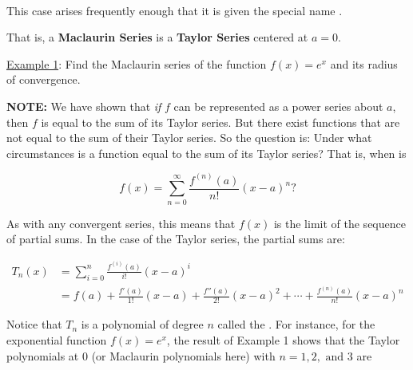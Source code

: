 \documentclass[paper=a4, fontsize=11pt]{scrartcl} %
\numberwithin{equation}{section} %
\numberwithin{figure}{section} %
\numberwithin{table}{section} %
\newcommand{\ds}{\displaystyle}
\begin{document}
\fbox{
  \parbox{\textwidth}{
  \vspace{5pt}
  
  \[f(x) = \ds\sum_{n=0}^\infty \ds\frac{f^{(n)}(0)}{n!}x^{n} = f(0) + \ds\frac{f'(0)}{1!} + \ds\frac{f''(0)}{2!}x^2 + \cdots\]
  }}
  \indent\\
  \indent
  
  This case arises frequently enough that it is given the special name \underline{\hspace{1in}} \underline{\hspace{1in}}. \\
  \indent
  
  That is, a \textbf{Maclaurin Series} is a \textbf{Taylor Series} centered at $a=0$.\\
  \indent
  
  \newpage
  
  \underline{Example 1}: Find the Maclaurin series of the function $f(x)=e^x$ and its radius of convergence.\\
  \indent
  
  \vspace{4in}
  
  \newpage
  
  \textbf{NOTE:} We have shown that \textit{if} $f$ can be represented as a power series about $a$, then $f$ is equal to the sum of its Taylor series. But there exist functions that are not equal to the sum of their Taylor series. So the question is: Under what circumstances is a function equal to the sum of its Taylor series? That is, when is
  
  \[f(x) = \ds\sum_{n=0}^\infty \ds\frac{f^{(n)}(a)}{n!}(x-a)^n ?\]
  
  As with any convergent series, this means that $f(x)$ is the limit of the sequence of partial sums. In the case of the Taylor series, the partial sums are:
  
  \begin{align*}
  T_n(x) &= \ds\sum_{i=0}^n \ds\frac{f^{(i)}(a)}{i!}(x-a)^i\\
  &= f(a) + \ds\frac{f'(a)}{1!}(x-a) + \ds\frac{f''(a)}{2!}(x-a)^2 + \cdots + \ds\frac{f^{(n)}(a)}{n!}(x-a)^n
  \end{align*}
  \indent
  
  Notice that $T_n$ is a polynomial of degree $n$ called the \underline{\hspace{3in}}. For instance, for the exponential function $f(x)=e^x$, the result of Example 1 shows that the Taylor polynomials at 0 (or Maclaurin polynomials here) with $n=1,2, \text{ and } 3$ are
  
\end{document}
